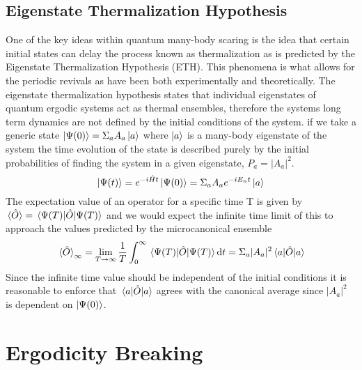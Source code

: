 \subsection{Eigenstate Thermalization Hypothesis}
One of the key ideas within quantum many-body scaring is the idea that certain initial states can delay the process known as thermalization as is predicted by the Eigenstate Thermalization Hypothesis (ETH)\citep{srednicki_chaos_1994}. This phenomena is what allows for the periodic revivals as have been both experimentally and theoretically. The eigenstate thermalization hypothesis states that individual eigenstates of quantum ergodic systems act as thermal ensembles, therefore the systems long term dynamics are not defined by the initial conditions of the system. if we take a generic state $\ket{\Psi(0)} = \Sigma_a A_a \ket{a}$ where $\ket{a}$ is a many-body eigenstate of the system the time evolution of the state is described purely by the initial probabilities of finding the system in a given eigenstate, $P_a = |A_a|^2$.
\begin{equation}
  \ket{\Psi (t)} = e ^{-i\hat{H}t}\ket{\Psi(0)} = \Sigma_a A_ae^{-iE_nt}\ket{a}
\end{equation}  
The expectation value of an operator for a specific time T is given by $\expval*{\hat{O}} = \expval*{\hat{O}}{\Psi(T)}$ and we would expect the infinite time limit of this to approach the values predicted by the microcanonical ensemble \citep{rigol_thermalization_2008}
\begin{equation}
\expval*{\hat{O}}_\infty
= \lim_{T\rightarrow \infty} \frac{1}{T} \int_0^\infty \expval*{\hat{O}}{\Psi(T)} \dd t = \Sigma_a |A_a|^2\expval*{\hat{O}}{a}
\end{equation}
Since the infinite time value should be independent of the initial conditions it is reasonable to enforce that $\expval*{\hat{O}}{a}$ agrees with the canonical average since $|A_a|^2$ is dependent on $\ket{\Psi(0)}$. \citep{Abanin2019}


\section{Ergodicity Breaking}
